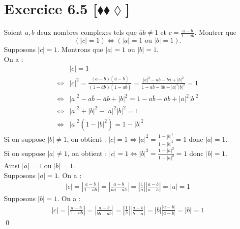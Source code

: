 \documentclass[10pt]{article}
\begin{document}


\section*{Exercice 6.5 [$\blacklozenge\blacklozenge\lozenge$]}
\begin{tcolorbox}[enhanced, width=7in, center, size=fbox, fontupper=\large, drop shadow southwest]
    Soient $a,b$ deux nombres complexes tels que $\overline{a}b\neq1$ et $c=\frac{a-b}{1-\overline{a}b}$. Montrer que
    \begin{equation*}
        (|c|=1) \iff (|a| = 1 \text{ ou } |b| = 1).
    \end{equation*}
    Supposons $|c|=1$. Montrons que $|a|=1$ ou $|b|=1$.\\
    On a :
    \begin{align*}
        &|c|=1\\
        \iff&|c|^2=\frac{(a-b)(\overline{a}-\overline{b})}{(1-\overline{a}b)(1-a\overline{b})}=\frac{|a|^2-a\overline{b}-b\overline{a}+|b|^2}{1-a\overline{b}-\overline{a}b+|a|^2|b|^2}=1\\
        \iff&|a|^2-a\overline{b}-\overline{a}b+|b|^2=1-a\overline{b}-\overline{a}b+|a|^2|b|^2\\
        \iff&|a|^2+|b|^2-|a|^2|b|^2=1\\
        \iff&|a|^2(1-|b|^2)=1-|b|^2
    \end{align*}
    Si on suppose $|b|\neq1$, on obtient : $|c|=1\iff|a|^2=\frac{1-|b|^2}{1-|b|^2}=1$ donc $|a|=1$.\\
    Si on suppose $|a|\neq1$, on obtient : $|c|=1\iff|b|^2=\frac{1-|a|^2}{1-|a|^2}=1$ donc $|b|=1$.\\
    Ainsi $|a|=1$ ou $|b|=1$.\\[0.25cm]
    Supposons $|a|=1$. 
    On a :
    \begin{align*}
        |c|=\left|\frac{a-b}{1-\overline{a}b}\right|=\left|\frac{a-b}{\overline{a}a-\overline{a}b}\right|=\left|\frac{1}{\overline{a}}\right|\left|\frac{a-b}{a-b}\right|=|a|=1
    \end{align*}
    Supposons $|b|=1$. 
    On a :
    \begin{align*}
        |c|=\left|\frac{a-b}{1-\overline{a}b}\right|=\left|\frac{a-b}{\overline{b}b-\overline{a}b}\right|=\left|\frac{1}{b}\right|\left|\frac{a-b}{\overline{b}-\overline{a}}\right|=|b|\frac{|a-b|}{|a-b|}=|b|=1
    \end{align*}
    \qed
\end{tcolorbox}

\end{document}

